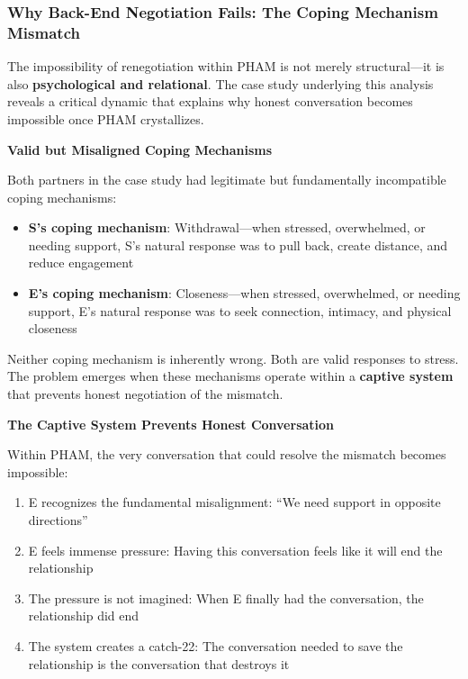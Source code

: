\documentclass[12pt, letterpaper]{article}
\begin{document}
\subsubsection{Why Back-End Negotiation Fails: The Coping Mechanism Mismatch}

The impossibility of renegotiation within PHAM is not merely structural---it is also \textbf{psychological and relational}. The case study underlying this analysis reveals a critical dynamic that explains why honest conversation becomes impossible once PHAM crystallizes.

\textbf{Valid but Misaligned Coping Mechanisms}

Both partners in the case study had legitimate but fundamentally incompatible coping mechanisms:

\begin{itemize}
    \item \textbf{S's coping mechanism}: Withdrawal---when stressed, overwhelmed, or needing support, S's natural response was to pull back, create distance, and reduce engagement
    \item \textbf{E's coping mechanism}: Closeness---when stressed, overwhelmed, or needing support, E's natural response was to seek connection, intimacy, and physical closeness
\end{itemize}

Neither coping mechanism is inherently wrong. Both are valid responses to stress. The problem emerges when these mechanisms operate within a \textbf{captive system} that prevents honest negotiation of the mismatch.

\textbf{The Captive System Prevents Honest Conversation}

Within PHAM, the very conversation that could resolve the mismatch becomes impossible:

\begin{enumerate}
    \item E recognizes the fundamental misalignment: ``We need support in opposite directions''
    \item E feels immense pressure: Having this conversation feels like it will end the relationship
    \item The pressure is not imagined: When E finally had the conversation, the relationship did end
    \item The system creates a catch-22: The conversation needed to save the relationship is the conversation that destroys it
\end{enumerate}
\end{document}
